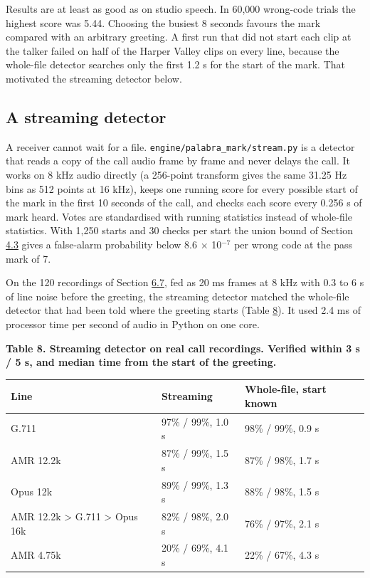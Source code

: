 \documentclass[10pt,a4paper]{article}
\begin{document}
Results are at least as good as on studio speech. In 60,000 wrong-code trials the highest score was 5.44. Choosing the busiest 8 seconds favours the mark compared with an arbitrary greeting. A first run that did not start each clip at the talker failed on half of the Harper Valley clips on every line, because the whole-file detector searches only the first 1.2 s for the start of the mark. That motivated the streaming detector below.

\subsection{A streaming detector}\label{s-6-8}

A receiver cannot wait for a file. \texttt{engine/palabra\_mark/stream.py} is a detector that reads a copy of the call audio frame by frame and never delays the call. It works on 8 kHz audio directly (a 256-point transform gives the same 31.25 Hz bins as 512 points at 16 kHz), keeps one running score for every possible start of the mark in the first 10 seconds of the call, and checks each score every 0.256 s of mark heard. Votes are standardised with running statistics instead of whole-file statistics. With 1,250 starts and 30 checks per start the union bound of Section \hyperref[s-4-3]{4.3} gives a false-alarm probability below 8.6 $\times$ 10$^{-7}$ per wrong code at the pass mark of 7.

On the 120 recordings of Section \hyperref[s-6-7]{6.7}, fed as 20 ms frames at 8 kHz with 0.3 to 6 s of line noise before the greeting, the streaming detector matched the whole-file detector that had been told where the greeting starts (Table \hyperref[t-8]{8}). It used 2.4 ms of processor time per second of audio in Python on one core.

\begin{center}\small {}\label{t-8}\textbf{Table 8. Streaming detector on real call recordings. Verified within 3 s / 5 s, and median time from the start of the greeting.}\end{center}

{\def\LTcaptype{none} %
\begin{longtable}[]{@{}lll@{}}
\toprule\noalign{}
Line & Streaming & Whole-file, start known \\
\midrule\noalign{}
\endhead
\bottomrule\noalign{}
\endlastfoot
G.711 & 97\% / 99\%, 1.0 s & 98\% / 99\%, 0.9 s \\
AMR 12.2k & 87\% / 99\%, 1.5 s & 87\% / 98\%, 1.7 s \\
Opus 12k & 89\% / 99\%, 1.3 s & 88\% / 98\%, 1.5 s \\
AMR 12.2k \textgreater{} G.711 \textgreater{} Opus 16k & 82\% / 98\%, 2.0 s & 76\% / 97\%, 2.1 s \\
AMR 4.75k & 20\% / 69\%, 4.1 s & 22\% / 67\%, 4.3 s \\
\end{longtable}
}
\end{document}
